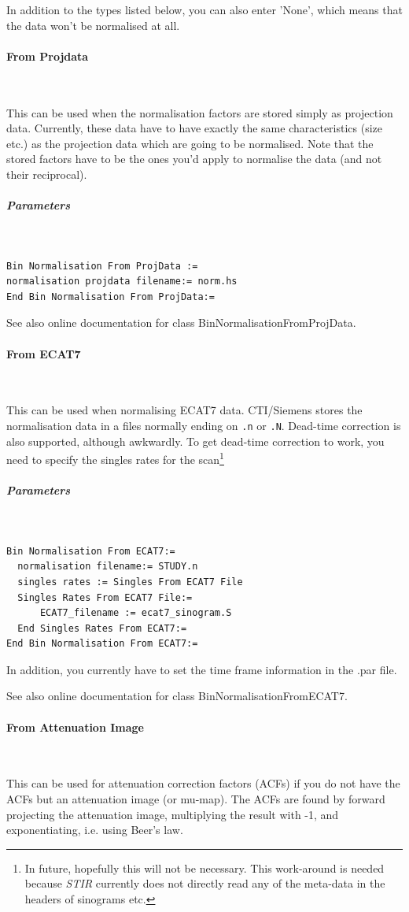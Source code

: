\documentclass{article}
\newcommand{\subsubsubsection}[1]{\paragraph{#1}\mbox{} \\}
\newcommand{\subsubsubsubsection}[1]{\subparagraph{#1} \mbox{} \\}
\begin{document}
{{{{{{In addition to the types listed below, you can also enter 'None', 
which means that the data won't be normalised at all.

{ \subsubsubsection{From Projdata}
}\label{sec:binnormalisationFromProjData}
This can be used when the normalisation factors are stored simply 
as projection data. Currently, these data have to have exactly 
the same characteristics (size etc.) as the projection data which 
are going to be normalised. Note that the stored factors have 
to be the ones you'd apply to normalise the data (and not their 
reciprocal).

{ \subsubsubsubsection{Parameters}
}
\begin{verbatim}
Bin Normalisation From ProjData :=
normalisation projdata filename:= norm.hs
End Bin Normalisation From ProjData:=
\end{verbatim}

See also online documentation for class BinNormalisationFromProjData.

{ \subsubsubsection{From ECAT7}
}
This can be used when normalising ECAT7 data. CTI/Siemens stores
the normalisation data in a files normally ending on
\texttt{.n} or \texttt{.N}. Dead-time correction is also
supported, although awkwardly. To get dead-time correction
to work, you need to specify the singles rates for the 
scan\footnote{In future, hopefully this will not be necessary.
This work-around is needed because \textit{STIR} currently does not
directly read any of the meta-data in the headers of sinograms etc.}
{ \subsubsubsubsection{Parameters}
}
\begin{verbatim}
Bin Normalisation From ECAT7:=
  normalisation filename:= STUDY.n
  singles rates := Singles From ECAT7 File
  Singles Rates From ECAT7 File:=
      ECAT7_filename := ecat7_sinogram.S
  End Singles Rates From ECAT7:=
End Bin Normalisation From ECAT7:=
\end{verbatim}

In addition, you currently have to set the time frame information in the .par file.

See also online documentation for class BinNormalisationFromECAT7.

{ \subsubsubsection{From Attenuation Image}
}
\label{sec:binnormalisationfromattenuationimage}
This can be used for attenuation correction factors (ACFs) if 
you do not have the ACFs but an attenuation image (or mu-map). 
The ACFs are found by forward projecting the attenuation image, 
multiplying the result with -1, and exponentiating, i.e. using 
Beer's law.



}}}}}}
\end{document}
